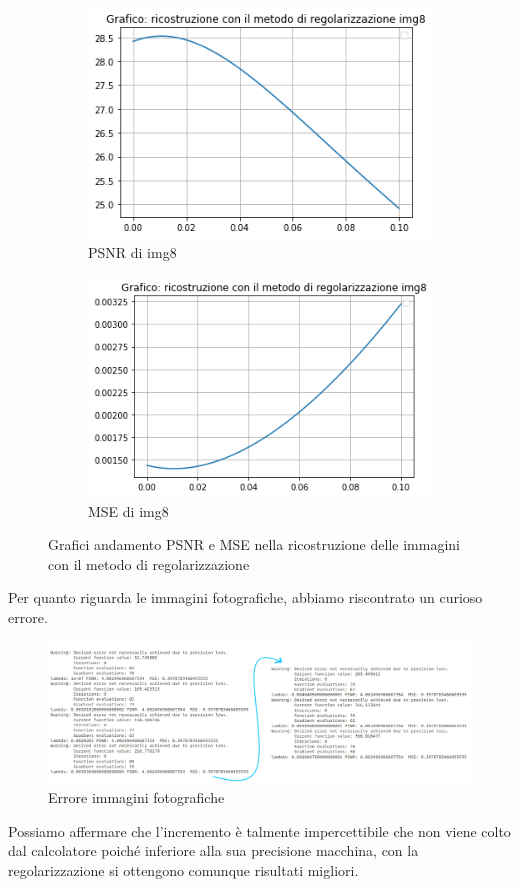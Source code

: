 \begin{figure}[H]
    \begin{subfigure}{0.5\textwidth}
        \centering
        \includegraphics[width=\textwidth]{output/PSNR/outputPSNR-img8.png}
        \caption{PSNR di img8}
        \label{fig:img8PSNR}
    \end{subfigure}\hfill
    \begin{subfigure}{0.5\textwidth}
        \centering
        \includegraphics[width=\textwidth]{output/MSE/outputMSE-img8.png}
        \caption{MSE di img8}
        \label{fig:img8MSE}
    \end{subfigure}
\caption{Grafici andamento PSNR e MSE nella ricostruzione delle immagini con il metodo di regolarizzazione}
\end{figure}

Per quanto riguarda le immagini fotografiche, abbiamo riscontrato un curioso errore. 

\begin{figure}[H]
    \centering
    \includegraphics[width=\textwidth]{output/outputERROR.png}
    \caption{Errore immagini fotografiche}
    \label{fig:errorOutput}
\end{figure}

Possiamo affermare che l'incremento è talmente impercettibile che non viene colto dal calcolatore poiché inferiore alla sua precisione macchina, con la regolarizzazione si ottengono comunque risultati migliori. 

